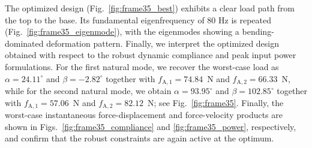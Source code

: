 \documentclass[preprint,3p]{elsarticle}
\newcommand{\A}{\mathrm{A}}
\numberwithin{equation}{section}
\begin{document}
The optimized design (Fig.~\ref{fig:frame35_best}) exhibits a clear load path from the top to the base. Its fundamental eigenfrequency of $80$ Hz is repeated (Fig.~\ref{fig:frame35_eigenmode}), with the eigenmodes showing a bending-dominated deformation pattern. Finally, we interpret the optimized design obtained with respect to the robust dynamic compliance and peak input power formulations. For the first natural mode, we recover the worst-case load as $\alpha = 24.11^\circ$ and $\beta = -2.82^\circ$ together with $f_{\A,1} = 74.84$~N and $f_{\A,2} = 66.33$~N, while for the second natural mode, we obtain $\alpha = 93.95^\circ$ and $\beta = 102.85^\circ$ together with $f_{\A,1} = 57.06$~N and $f_{\A,2} = 82.12$~N; see Fig.~\ref{fig:frame35}. Finally, the worst-case instantaneous force-displacement and force-velocity products are shown in Figs.~\ref{fig:frame35_compliance} and \ref{fig:frame35_power}, respectively, and confirm that the robust constraints are again active at the optimum.
\end{document}
